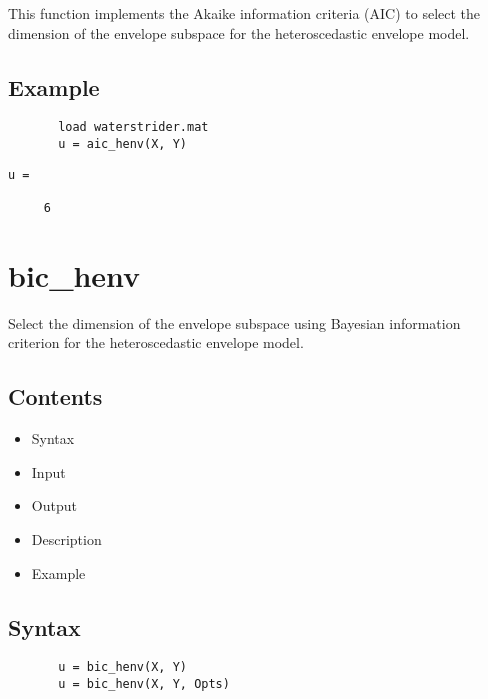 \documentclass[a4paper,11pt,openany]{memoir}
\begin{document}
\begin{par}
This function implements the Akaike information criteria (AIC) to select the dimension of the envelope subspace for the heteroscedastic envelope model.
\end{par} \vspace{1em}


\subsection*{Example}


\begin{verbatim}       load waterstrider.mat
       u = aic_henv(X, Y)\end{verbatim}
    
        \color{lightgray}\ttfamily \begin{verbatim}
u =

     6

\end{verbatim} \rmfamily
\color{black}
    \newpage

\rmfamily
\color{black}\section{bic\_henv}

\begin{par}
Select the dimension of the envelope subspace using Bayesian information criterion for the heteroscedastic envelope model.
\end{par} \vspace{1em}

\subsection*{Contents}

\begin{itemize}
\setlength{\itemsep}{-1ex}
   \item Syntax
   \item Input
   \item Output
   \item Description
   \item Example
\end{itemize}


\subsection*{Syntax}


\begin{verbatim}       u = bic_henv(X, Y)
       u = bic_henv(X, Y, Opts)\end{verbatim}
    
\end{document}
